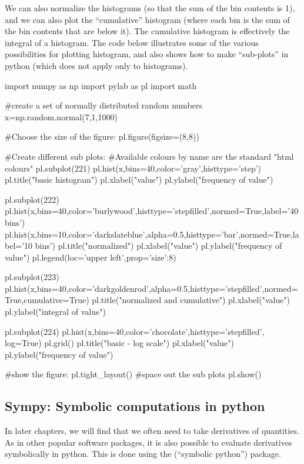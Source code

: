 We can also normalize the histograms (so that the sum of the bin contents is 1), and we can also plot the ``cumulative'' histogram (where each bin is the sum of the bin contents that are below it). The cumulative histogram is effectively the integral of a histogram. The code below illustrates some of the various possibilities for plotting histogram, and also shows how to make ``sub-plots'' in python (which does not apply only to histograms).
\begin{python}[caption = \mbox{}]
import numpy as np
import pylab as pl
import math 

#create a set of normally distributed random numbers
x=np.random.normal(7,1,1000)

#Choose the size of the figure:
pl.figure(figsize=(8,8))

#Create different sub plots:
#Available colours by name are the standard "html colours"
pl.subplot(221)
pl.hist(x,bins=40,color='gray',histtype='step')
pl.title("basic histogram")
pl.xlabel("value")
pl.ylabel("frequency of value")

pl.subplot(222)
pl.hist(x,bins=40,color='burlywood',histtype='stepfilled',normed=True,label='40 bins')
pl.hist(x,bins=10,color='darkslateblue',alpha=0.5,histtype='bar',normed=True,label='10 bins')
pl.title("normalized")
pl.xlabel("value")
pl.ylabel("frequency of value")
pl.legend(loc='upper left',prop={'size':8})

pl.subplot(223)
pl.hist(x,bins=40,color='darkgoldenrod',alpha=0.5,histtype='stepfilled',normed=True,cumulative=True)
pl.title("normalized and cumulative")
pl.xlabel("value")
pl.ylabel("integral of value")

pl.subplot(224)
pl.hist(x,bins=40,color='chocolate',histtype='stepfilled', log=True)
pl.grid()
pl.title("basic - log scale")
pl.xlabel("value")
pl.ylabel("frequency of value")

#show the figure:
pl.tight_layout() #space out the sub plots
pl.show()
\end{python}

\subsection{Sympy: Symbolic computations in python}
In later chapters, we will find that we often need to take derivatives of quantities. As in other popular software packages, it is also possible to evaluate derivatives symbolically in python. This is done using the  (``symbolic python'') package. 

